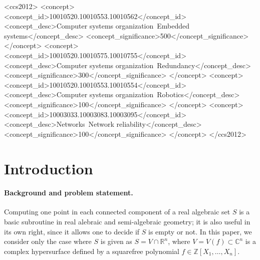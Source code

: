 \documentclass[sigconf]{acmart}
\def\C{\mathbb{C}}
\def\ZZ{\mathbb{Z}}
\def\R{\mathbb{R}}
\newcommand{\ZZ}{{\mathbb{Z}}}
\begin{document}
\begin{CCSXML}
<ccs2012>
 <concept>
  <concept_id>10010520.10010553.10010562</concept_id>
  <concept_desc>Computer systems organization~Embedded systems</concept_desc>
  <concept_significance>500</concept_significance>
 </concept>
 <concept>
  <concept_id>10010520.10010575.10010755</concept_id>
  <concept_desc>Computer systems organization~Redundancy</concept_desc>
  <concept_significance>300</concept_significance>
 </concept>
 <concept>
  <concept_id>10010520.10010553.10010554</concept_id>
  <concept_desc>Computer systems organization~Robotics</concept_desc>
  <concept_significance>100</concept_significance>
 </concept>
 <concept>
  <concept_id>10003033.10003083.10003095</concept_id>
  <concept_desc>Networks~Network reliability</concept_desc>
  <concept_significance>100</concept_significance>
 </concept>
</ccs2012>
\end{CCSXML}


\setcounter{secnumdepth}{4}
\renewcommand{\theparagraph}{\thesubsection.\arabic{paragraph}}
\titleformat{\paragraph}[runin]{\normalfont\normalsize\bfseries}{\theparagraph.}{1em}{}
\titlespacing*{\paragraph}{0em}{1ex}{1em}
\newcommand{\pref}[1]{{\bf\ref{#1}}}


\maketitle


\section{Introduction}


\paragraph*{Background and problem statement.}
Computing one point in each connected component of a real algebraic
set $S$ is a basic subroutine in real alebraic and semi-algebraic
geometry; it is also useful in its own right, since it allows one to
decide if $S$ is empty or not. In this paper, we consider only the
case where $S$ is given as $S=V \cap \R^n$, where $V=V(f) \subset
\C^n$ is a complex hypersurface defined by a squarefree polynomial $f
\in \ZZ[X_1,\dots,X_n]$.
\end{document}
